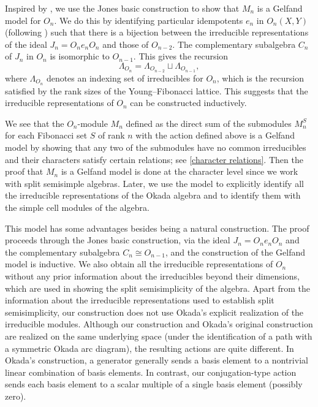 \documentclass[12pt,reqno]{amsart}
\numberwithin{equation}{section}
\theoremstyle{definition}
\theoremstyle{definition}
\begin{document}
Inspired by \cite{HalversonReeks}, we use the Jones basic construction to show that $M_n$ is a Gelfand model for $O_n$. We do this by identifying particular idempotents $e_n$ in $O_n(X,Y)$ (following \cite{HalversonRam}) such that there is a bijection between the irreducible representations of the ideal $J_n=O_ne_nO_n$ and those of $O_{n-2}$. The complementary subalgebra $C_n$ of $J_n$ in $O_n$ is isomorphic to $O_{n-1}$. This gives the recursion \[
\Lambda_{O_n}=\Lambda_{O_{n-2}}\sqcup\Lambda_{O_{n-1}},\]
where $\Lambda_{O_n}$ denotes an indexing set of irreducibles for $O_n$, which is the recursion satisfied by the rank sizes of the Young--Fibonacci lattice. This suggests that the irreducible representations of $O_n$ can be constructed inductively. 


We see that the $O_n$-module $M_n$ defined as the direct sum of the submodules $M_n^S$ for each Fibonacci set $S$ of rank $n$ with the action defined above is a Gelfand model by showing that any two of the submodules have no common irreducibles and their characters satisfy certain relations; see \eqref{character relations}. Then the proof that $M_n$ is a Gelfand model is done at the character level since we work with split semisimple algebras. Later, we use the model to explicitly identify all the irreducible representations of the Okada algebra and to identify them with the simple cell modules of the algebra.


This model has some advantages besides being a natural construction. The proof proceeds through the Jones basic construction, via the ideal $J_n=O_ne_nO_n$ and the complementary subalgebra $C_n\cong O_{n-1}$, and the construction of the Gelfand model is inductive. We also obtain all the irreducible representations of $O_n$ without any prior information about the irreducibles beyond their dimensions, which are used in showing the split semisimplicity of the algebra. Apart from the information about the irreducible representations used to establish split semisimplicity, our construction does not use Okada's explicit realization of the irreducible modules. Although our construction and Okada's original construction are realized on the same underlying space (under the identification of a path with a symmetric Okada arc diagram), the resulting actions are quite different. In Okada's construction, a generator generally sends a basis element to a nontrivial linear combination of basis elements. In contrast, our conjugation-type action sends each basis element to a scalar multiple of a single basis element (possibly zero).  
\end{document}
